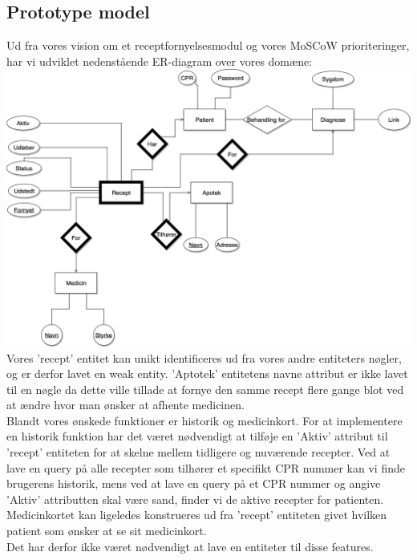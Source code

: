 \subsection{Prototype model}
Ud fra vores vision om et receptfornyelsesmodul og vores MoSCoW prioriteringer, har vi udviklet nedenstående ER-diagram over vores domæne:
\\
\includegraphics[width=\linewidth]{Materials/Prototype/ER_prototype}\\
Vores 'recept' entitet kan unikt identificeres ud fra vores andre entiteters nøgler, og er derfor lavet en weak entity. 'Aptotek' entitetens navne attribut er ikke lavet til en nøgle da dette ville tillade at fornye den samme recept flere gange blot ved at ændre hvor man ønsker at afhente medicinen.\\
Blandt vores ønskede funktioner er historik og medicinkort. For at implementere en historik funktion har det været nødvendigt at tilføje en 'Aktiv' attribut til 'recept' entiteten for at skelne mellem tidligere og nuværende recepter. Ved at lave en query på alle recepter som tilhører et specifikt CPR nummer kan vi finde brugerens historik, mens ved at lave en query på et CPR nummer og angive 'Aktiv' attributten skal være sand, finder vi de aktive recepter for patienten.\\
Medicinkortet kan ligeledes konstrueres ud fra 'recept' entiteten givet hvilken patient som ønsker at se sit medicinkort.\\ 
Det har derfor ikke været nødvendigt at lave en entiteter til disse features.\\

